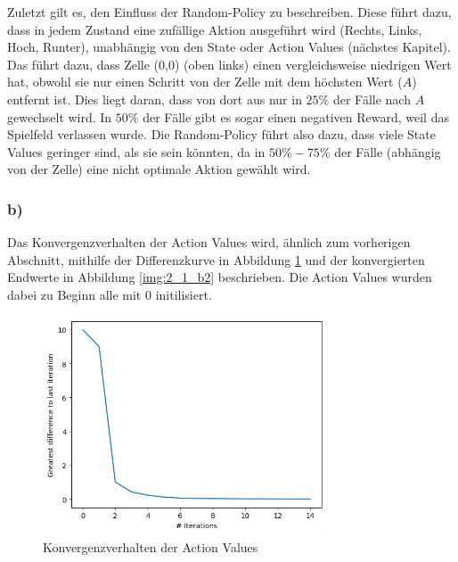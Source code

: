 \documentclass[11pt]{article}
\begin{document}
Zuletzt gilt es, den Einfluss der Random-Policy zu beschreiben. Diese führt dazu, dass in jedem Zustand eine zufällige Aktion ausgeführt wird (Rechts, Links, Hoch, Runter), unabhängig von den State oder Action Values (nächstes Kapitel). Das führt dazu, dass Zelle (0,0) (oben links) einen vergleichsweise niedrigen Wert hat, obwohl sie nur einen Schritt von der Zelle mit dem höchsten Wert ($A$) entfernt ist. Dies liegt daran, dass von dort aus nur in $25\%$ der Fälle nach $A$ gewechselt wird. In $50\%$ der Fälle gibt es sogar einen negativen Reward, weil das Spielfeld verlassen wurde. Die Random-Policy führt also dazu, dass viele State Values geringer sind, als sie sein könnten, da in $50\%-75\%$ der Fälle (abhängig von der Zelle) eine nicht optimale Aktion gewählt wird.

\subsubsection*{b)}

Das Konvergenzverhalten der Action Values wird, ähnlich zum vorherigen Abschnitt, mithilfe der Differenzkurve in Abbildung \ref{img:2_1_b1} und der konvergierten Endwerte in Abbildung \ref{img:2_1_b2} beschrieben. Die Action Values wurden dabei zu Beginn alle mit $0$ initilisiert.

\begin{figure}
    \centering
    \includegraphics[width=0.75\textwidth]{img/img_2_1_b1.png}
    \caption{Konvergenzverhalten der Action Values}
    \label{img:2_1_b1}
\end{figure}
\end{document}
